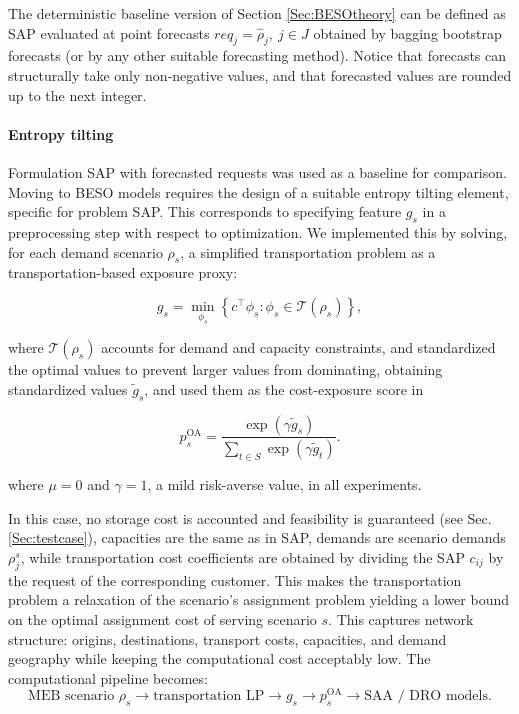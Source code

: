 \documentclass[mnsc,sglanonrev]{informs4}  %
\theoremstyle{remark}\newtheorem{remark}{Remark}
\begin{document}
The deterministic baseline version of Section \ref{Sec:BESOtheory} can be defined as SAP evaluated at point forecasts $req_j = \widehat \rho_j,\: j\in J$ obtained by bagging bootstrap forecasts (or by any other suitable forecasting method). Notice that forecasts can structurally take only non-negative values, and that forecasted values are rounded up to the next integer.

\paragraph{Entropy tilting}
Formulation SAP with forecasted requests was used as a baseline for comparison. Moving to BESO models requires the design of a suitable entropy tilting element, specific for problem SAP. This corresponds to specifying feature $g_s$ in a preprocessing step with respect to optimization. We implemented this by solving, for each demand scenario \(\rho_s\), a simplified transportation problem as a transportation-based exposure proxy:

$$ g_s= \min_{\phi_s}\left\{ c^\top \phi_s: \phi_s\in\mathcal T(\rho_s) \right\}, $$

\noindent where $\mathcal T(\rho_s)$ accounts for demand and capacity constraints, and standardized the optimal values to prevent larger values from dominating, obtaining standardized values $\widetilde g_s$, and used them as the cost-exposure score in

$$ p_s^{\mathrm{OA}} =
   \frac{\exp(\gamma \widetilde g_s)}
        {\sum_{t\in S}\exp(\gamma \widetilde g_t)}. $$

\noindent where $\mu=0$ and $\gamma=1$, a mild risk-averse value, in all experiments.

In this case, no storage cost is accounted and feasibility is guaranteed (see Sec. \ref{Sec:testcase}), capacities are the same as in SAP, demands are scenario demands $\rho_j^s$, while transportation cost coefficients are obtained by dividing the SAP $c_{ij}$ by the request of the corresponding customer. This makes the transportation problem a relaxation of the scenario’s assignment problem yielding a lower bound on the optimal assignment cost of serving scenario $s$. This captures network structure: origins, destinations, transport costs, capacities, and demand geography while keeping the computational cost acceptably low. The computational pipeline becomes:
$$ \text{MEB scenario }\rho_s \rightarrow \text{transportation LP} \rightarrow g_s \rightarrow p_s^{\mathrm{OA}} \rightarrow \text{SAA / DRO models}. $$
\end{document}
